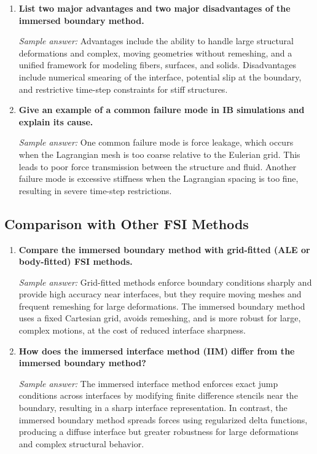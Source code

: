 \documentclass[12pt]{article}
\begin{document}
\begin{enumerate}[resume]
\item \textbf{List two major advantages and two major disadvantages of the immersed boundary method.}

\textit{Sample answer:}
Advantages include the ability to handle large structural deformations and complex, moving geometries without remeshing, and a unified framework for modeling fibers, surfaces, and solids. Disadvantages include numerical smearing of the interface, potential slip at the boundary, and restrictive time-step constraints for stiff structures.

\item \textbf{Give an example of a common failure mode in IB simulations and explain its cause.}

\textit{Sample answer:}
One common failure mode is force leakage, which occurs when the Lagrangian mesh is too coarse relative to the Eulerian grid. This leads to poor force transmission between the structure and fluid. Another failure mode is excessive stiffness when the Lagrangian spacing is too fine, resulting in severe time-step restrictions.
\end{enumerate}

\subsection*{Comparison with Other FSI Methods}

\begin{enumerate}[resume]
\item \textbf{Compare the immersed boundary method with grid-fitted (ALE or body-fitted) FSI methods.}

\textit{Sample answer:}
Grid-fitted methods enforce boundary conditions sharply and provide high accuracy near interfaces, but they require moving meshes and frequent remeshing for large deformations. The immersed boundary method uses a fixed Cartesian grid, avoids remeshing, and is more robust for large, complex motions, at the cost of reduced interface sharpness.

\item \textbf{How does the immersed interface method (IIM) differ from the immersed boundary method?}

\textit{Sample answer:}
The immersed interface method enforces exact jump conditions across interfaces by modifying finite difference stencils near the boundary, resulting in a sharp interface representation. In contrast, the immersed boundary method spreads forces using regularized delta functions, producing a diffuse interface but greater robustness for large deformations and complex structural behavior.
\end{enumerate}
\end{document}
